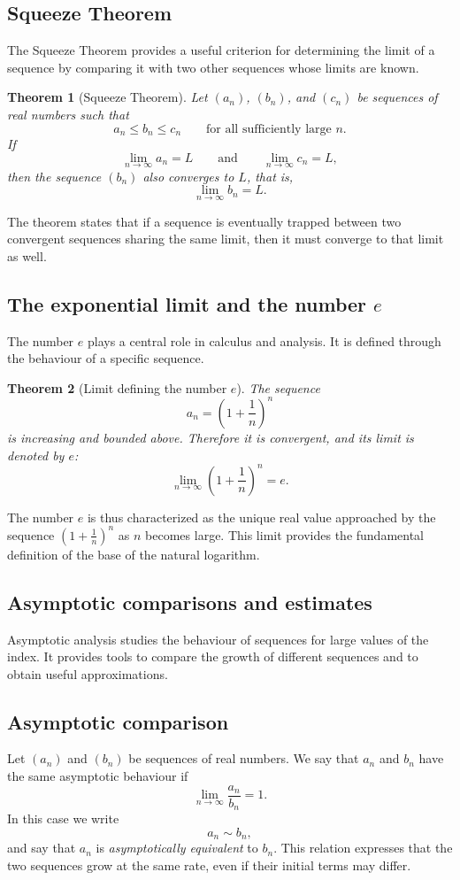 \documentclass[11pt,a4paper]{article}
\theoremstyle{definition} \newtheorem{definition}{Definition} \theoremstyle{plain} \newtheorem{theorem}{Theorem}
\begin{document}
\subsection{Squeeze Theorem}
The Squeeze Theorem provides a useful criterion for determining the limit of a sequence by comparing it with two other sequences whose limits are known.
\begin{theorem}[Squeeze Theorem]\label{thm:squeeze} Let $(a_n)$, $(b_n)$, and $(c_n)$ be sequences of real numbers such that
\[ a_n \le b_n \le c_n \qquad \text{for all sufficiently large } n. \]
If
\[ \lim_{n\to\infty} a_n = L \qquad \text{and} \qquad \lim_{n\to\infty} c_n = L, \]
then the sequence $(b_n)$ also converges to $L$, that is,
\[ \lim_{n\to\infty} b_n = L. \]
\end{theorem}
The theorem states that if a sequence is eventually trapped between two convergent sequences sharing the same limit, then it must converge to that limit as well.
\subsection{The exponential limit and the number \texorpdfstring{$e$}{e}}
The number $e$ plays a central role in calculus and analysis.
It is defined through the behaviour of a specific sequence.
\begin{theorem}[Limit defining the number $e$]\label{thm:limit-e} The sequence
\[ a_n = \left(1+\frac{1}{n}\right)^n \]
is increasing and bounded above.
Therefore it is convergent, and its limit is denoted by $e$:
\[ \lim_{n\to\infty} \left(1+\frac{1}{n}\right)^n = e. \]
\end{theorem}
The number $e$ is thus characterized as the unique real value approached by the sequence $\left(1+\frac{1}{n}\right)^n$ as $n$ becomes large.
This limit provides the fundamental definition of the base of the natural logarithm.
\subsection{Asymptotic comparisons and estimates}
Asymptotic analysis studies the behaviour of sequences for large values of the index.
It provides tools to compare the growth of different sequences and to obtain useful approximations.
\subsection*{Asymptotic comparison}
Let $(a_n)$ and $(b_n)$ be sequences of real numbers.
We say that $a_n$ and $b_n$ have the same asymptotic behaviour if
\[ \lim_{n\to\infty} \frac{a_n}{b_n} = 1. \]
In this case we write
\[ a_n \sim b_n, \]
and say that $a_n$ is \emph{asymptotically equivalent} to $b_n$.
This relation expresses that the two sequences grow at the same rate, even if their initial terms may differ.
\end{document}
